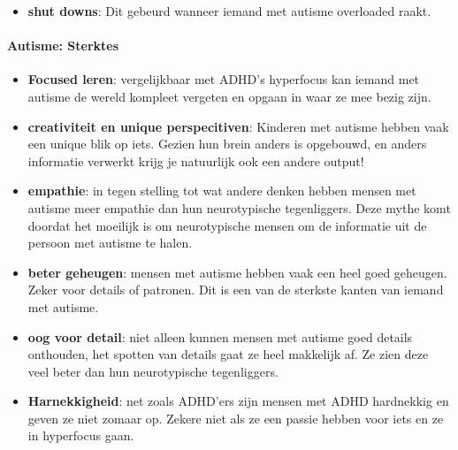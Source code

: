 \begin{itemize}
                        \item \textbf{shut downs}\cite{autisme-shutdowns}: Dit gebeurd wanneer iemand met autisme overloaded raakt.
                        
                    \end{itemize}
                    
                \bigskip
                \noindent\paragraph{Autisme: Sterktes}
                    \begin{itemize}
                        
                        \item \textbf{Focused leren}\cite{autisme-upsides}: 
                            vergelijkbaar met ADHD's hyperfocus kan iemand met autisme de wereld kompleet vergeten en opgaan in waar ze mee bezig zijn.
                            
                        \item \textbf{creativiteit en unique perspecitiven}\cite{autisme-upsides}:
                            Kinderen met autisme hebben vaak een unique blik op iets. Gezien hun brein anders is opgebouwd, en anders informatie verwerkt krijg je natuurlijk ook een andere output!

                        \item \textbf{empathie}\cite{autisme-upsides}: 
                            in tegen stelling tot wat andere denken hebben mensen met autisme meer empathie dan hun neurotypische tegenliggers. Deze mythe komt doordat het moeilijk is om neurotypische mensen om de informatie uit de persoon met autisme te halen.

                        \item \textbf{beter geheugen}\cite{autisme-upsides}: 
                            mensen met autisme hebben vaak een heel goed geheugen. Zeker voor details of patronen. Dit is een van de sterkste kanten van iemand met autisme.

                        \item \textbf{oog voor detail}\cite{autisme-upsides}: 
                            niet alleen kunnen mensen met autisme goed details onthouden, het spotten van details gaat ze heel makkelijk af. Ze zien deze veel beter dan hun neurotypische tegenliggers.
                            
                        \item \textbf{Harnekkigheid}\cite{autisme-upsides}:
                            net zoals ADHD'ers zijn mensen met ADHD hardnekkig en geven ze niet zomaar op. Zekere niet als ze een passie hebben voor iets en ze in hyperfocus gaan.
                            
                    \end{itemize}                    
                    
